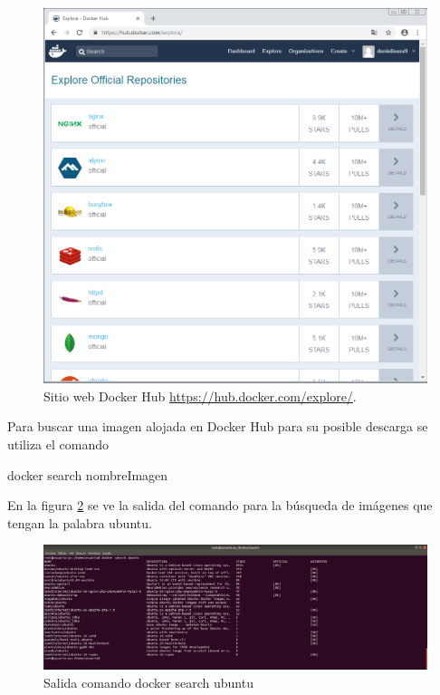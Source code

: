 \begin{figure}[!hbtp]
	\centering
	\includegraphics[width=\linewidth]{RE05_Docker/Gestion_basica/REDocker_Gestion4.png}
	\vspace{-0.2cm}
	\caption{Sitio web Docker Hub \url{https://hub.docker.com/explore/}.}
	\label{fig:DockerGestion4}
\end{figure}

Para buscar una imagen alojada en Docker Hub para su posible descarga se utiliza el comando 
\begin{commandshell}docker search nombreImagen\end{commandshell}

En la figura \ref{fig:DockerGestion3} se ve la salida del comando para la búsqueda de imágenes que tengan la palabra ubuntu.

\begin{figure}[!hbtp]
	\centering
	\includegraphics[width=\linewidth]{RE05_Docker/Gestion_basica/REDocker_Gestion3.png}
	\vspace{-0.2cm}
	\caption{Salida comando docker search ubuntu}
	\label{fig:DockerGestion3}
\end{figure}

